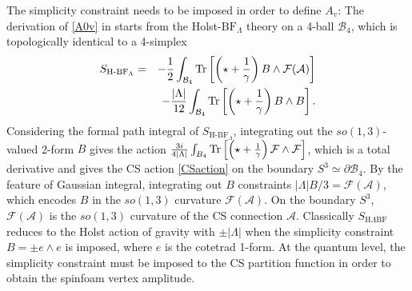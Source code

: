 \documentclass[aps,prd,notitlepage,nofootinbib,superscriptaddress,groupedaddress,twocolumn]{revtex4-1}
\def\be{\begin{eqnarray}}
\def\ee{\end{eqnarray}}
\newcommand{\ca}{\mathcal A}
\newcommand{\cb}{\mathcal B}
\newcommand{\cf}{\mathcal F}
\renewcommand{\L }{\Lambda}
\newcommand{\lt}{\left}
\newcommand{\rt}{\right}
\begin{document}
The simplicity constraint needs to be imposed in order to define $A_v$: The derivation of \eqref{A0v} in \cite{HHKR} starts from the Holst-$\mathrm{BF}_\L$ theory on a 4-ball $\cb_4$, which is topologically identical to a 4-simplex
\be
S_{\text{H-BF}_\L}&=&-\frac{1}{2} \int_{\cb_4}\Tr\lt[\left(\star+\frac{1}{\gamma}\right) B \wedge \mathcal{F}(\mathcal{A})\rt]\nonumber\\
&&-\frac{|\Lambda|}{12} \int_{\cb_4}\Tr\left[\left(\star+\frac{1}{\gamma} \right) B \wedge B\rt].\label{SHLBF}
\ee
Considering the formal path integral of $S_{\text{H-BF}_\L}$, integrating out the $so(1,3)$-valued 2-form $B$ gives the action $\frac{3i}{4|\L|}\int_{B_4}\Tr\left[\left(\star+\frac{1}{\gamma} \right)\mathcal{F} \wedge \mathcal{F}\rt]$, which is a total derivative and gives the CS action \eqref{CSaction} on the boundary $S^3\simeq \partial\cb_4$. By the feature of Gaussian integral, integrating out $B$ constraints $|\L| B/3=\cf (\ca)$, which encodes $B$ in the $so(1,3)$ curvature $\cf(\ca)$. On the boundary $S^3$, $\cf(\ca)$ is the $so(1,3)$ curvature of the CS connection $\ca$. Classically $S_{\text{H$\L$BF}}$ reduces to the Holst action of gravity with $\pm|\L|$ when the simplicity constraint $B=\pm e\wedge e$ is imposed, where $e$ is the cotetrad 1-form. At the quantum level, the simplicity constraint must be imposed to the CS partition function in order to obtain the spinfoam vertex amplitude. 
\end{document}

